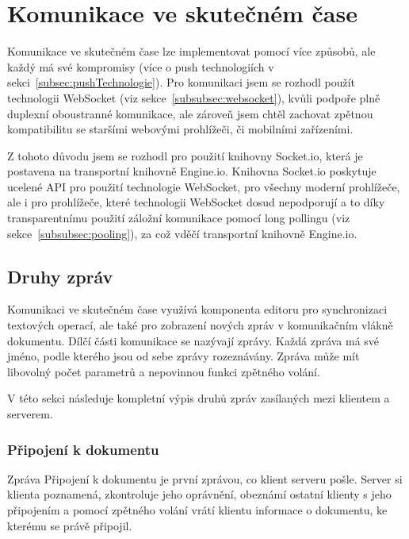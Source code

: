 
\section{Komunikace ve skutečném čase}\label{sec:komunikaceVeSkutečnémČase}

Komunikace ve skutečném čase lze implementovat pomocí více způsobů, ale každý má své kompromisy (více o push technologiích v sekci~\ref{subsec:pushTechnologie}).
Pro komunikaci jsem se rozhodl použít technologii WebSocket (viz sekce~\ref{subsubsec:websocket}), kvůli podpoře plně duplexní oboustranné komunikace, ale zároveň jsem chtěl zachovat zpětnou kompatibilitu se staršími webovými prohlížeči, či mobilními zařízeními.

Z tohoto důvodu jsem se rozhodl pro použití knihovny Socket.io, která je postavena na transportní knihovně Engine.io.
Knihovna Socket.io poskytuje ucelené \gls{API} pro použití technologie WebSocket, pro všechny moderní prohlížeče, ale i pro prohlížeče, které technologii WebSocket dosud nepodporují a to díky transparentnímu použití záložní komunikace pomocí long pollingu (viz sekce~\ref{subsubsec:pooling}), za což vděčí transportní knihovně Engine.io.

\subsection{Druhy zpráv}\label{subsec:druhyZprávyVeSkutečnémČase}

Komunikaci ve skutečném čase využívá komponenta editoru pro synchronizaci textových operací, ale také pro zobrazení nových zpráv v komunikačním vlákně dokumentu.
Dílčí části komunikace se nazývají zprávy.
Každá zpráva má své jméno, podle kterého jsou od sebe zprávy rozeznávány.
Zpráva může mít libovolný počet parametrů a nepovinnou funkci zpětného volání.

V této sekci následuje kompletní výpis druhů zpráv zasílaných mezi klientem a serverem.

\subsubsection{Připojení k dokumentu} %

Zpráva Připojení k dokumentu je první zprávou, co klient serveru pošle.
Server si klienta poznamená, zkontroluje jeho oprávnění, obeznámí ostatní klienty s jeho připojením a pomocí zpětného volání vrátí klientu informace o dokumentu, ke kterému se právě připojil.

